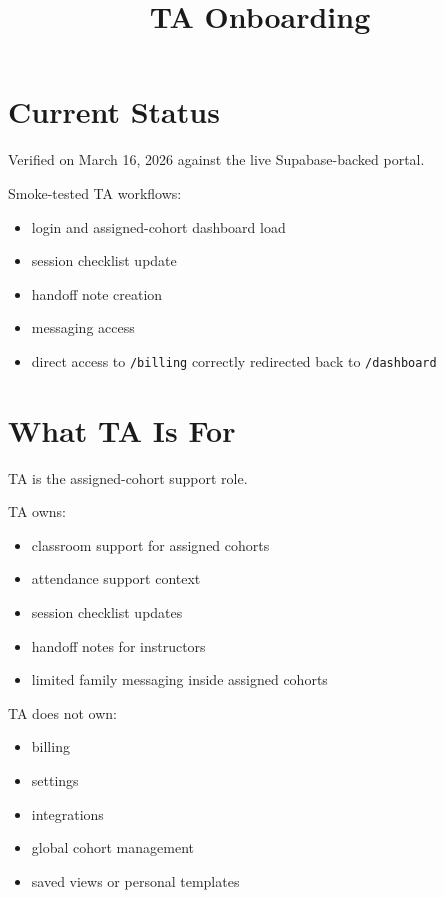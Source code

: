 \documentclass[11pt]{article}
\title{TA Onboarding}
\author{}
\date{}
\begin{document}
\maketitle

\section*{Current Status}
Verified on March 16, 2026 against the live Supabase-backed portal.

Smoke-tested TA workflows:
\begin{itemize}
  \item login and assigned-cohort dashboard load
  \item session checklist update
  \item handoff note creation
  \item messaging access
  \item direct access to \texttt{/billing} correctly redirected back to \texttt{/dashboard}
\end{itemize}

\section*{What TA Is For}
TA is the assigned-cohort support role.

TA owns:
\begin{itemize}
  \item classroom support for assigned cohorts
  \item attendance support context
  \item session checklist updates
  \item handoff notes for instructors
  \item limited family messaging inside assigned cohorts
\end{itemize}

TA does not own:
\begin{itemize}
  \item billing
  \item settings
  \item integrations
  \item global cohort management
  \item saved views or personal templates
\end{itemize}
\end{document}
